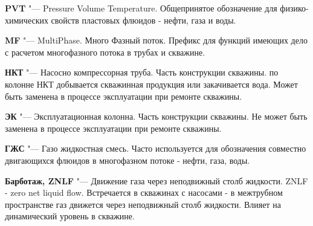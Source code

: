 \textbf{PVT} "--- Pressure Volume Temperature. Общепринятое обозначение для физико-химических свойств пластовых флюидов - нефти, газа и воды.

\textbf{MF} "--- MultiPhase. Много Фазный поток. Префикс для функций имеющих дело с расчетом многофазного потока в трубах и скважине.

\textbf{НКТ} "--- Насосно компрессорная труба. Часть конструкции скважины. по колонне НКТ добывается скважинная продукция или закачивается вода. Может быть заменена в процессе эксплуатации при ремонте скважины. 

\textbf{ЭК} "--- Эксплуатационная колонна. Часть конструкции скважины.  Не может быть заменена в процессе эксплуатации при ремонте скважины. 

\textbf{ГЖС} "--- Газо жидкостная смесь. Часто используется для обозначения совместно двигающихся флюидов в многофазном потоке - нефти, газа, воды.

\textbf{Барботаж, ZNLF} "--- Движение газа через неподвижный столб жидкости. ZNLF - zero net liquid flow. Встречается в скважинах с насосами - в межтрубном пространстве газ движется через неподвижный столб жидкости. Влияет на динамический уровень в скважине.
